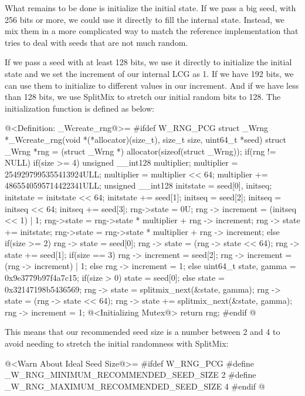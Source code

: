 What remains to be done is initialize the initial state. If we pass a
big seed, with 256 bits or more, we could use it directly to fill the
internal state. Instead, we mix them in a more complicated way to
match the reference implementation that tries to deal with seeds that
are not much random.

If we pass a seed with at least 128 bits, we use it directly to
initialize the initial state and we set the increment of our internal
LCG as 1. If we have 192 bits, we can use them to initialize to
different values in our increment. And if we have less than 128 bits,
we use SplitMix to stretch our initial random bits to 128. The
initialization function is defined as below:

\iniciocodigo
@<Definition: \_Wcreate\_rng@>=
#ifdef W_RNG_PCG
struct _Wrng *_Wcreate_rng(void *(*allocator)(size_t), size_t size,
                           uint64_t *seed){
  struct _Wrng *rng = (struct _Wrng *) allocator(sizeof(struct _Wrng));
  if(rng != NULL){
    if(size >= 4){
      unsigned __int128 multiplier;
      multiplier = 2549297995355413924ULL;
      multiplier = multiplier << 64;
      multiplier += 4865540595714422341ULL;
      unsigned __int128 initstate = seed[0], initseq;
      initstate = initstate << 64;
      initstate += seed[1];
      initseq = seed[2];
      initseq = initseq << 64;
      initseq += seed[3];
      rng->state = 0U;
      rng -> increment = (initseq << 1) | 1;
      rng->state = rng->state * multiplier + rng -> increment;
      rng -> state += initstate;
      rng->state = rng->state * multiplier + rng -> increment;
    }
    else if(size >= 2){
      rng -> state = seed[0];
      rng -> state = (rng -> state << 64);
      rng -> state += seed[1];
      if(size == 3){
        rng -> increment = seed[2];
        rng -> increment = (rng -> increment) | 1;
      }
      else
        rng -> increment = 1;
    }
    else{
      uint64_t state, gamma = 0x9e3779b97f4a7c15;
      if(size > 0)
        state = seed[0];
      else
        state = 0x32147198b5436569;
      rng -> state = splitmix_next(&state, gamma);
      rng -> state = (rng -> state << 64);
      rng -> state += splitmix_next(&state, gamma);
      rng -> increment = 1;
    }                           
    @<Initializing Mutex@>
  }
  return rng;
}
#endif
@
\fimcodigo

This means that our recommended seed size is a number between 2 and 4
to avoid needing to stretch the initial randomness with SplitMix:

\iniciocodigo
@<Warn About Ideal Seed Size@>=
#ifdef W_RNG_PCG
#define _W_RNG_MINIMUM_RECOMMENDED_SEED_SIZE  2
#define _W_RNG_MAXIMUM_RECOMMENDED_SEED_SIZE  4
#endif
@
\fimcodigo


